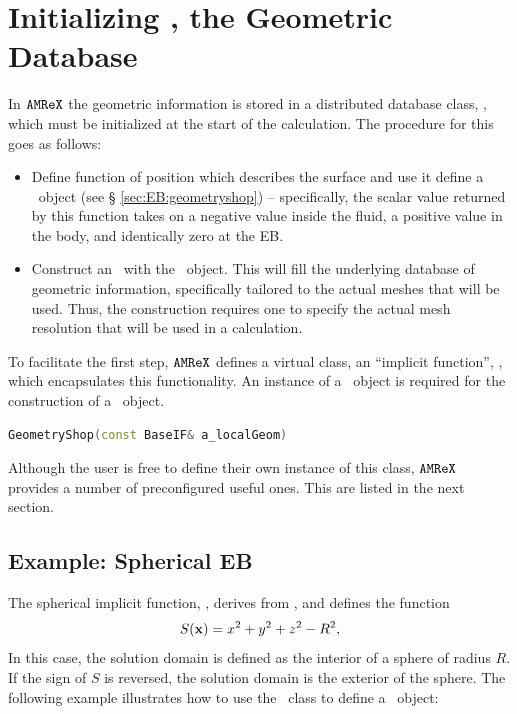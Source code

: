 \section{Initializing \ebis, the Geometric Database}
\label{sec:EB:ebinit}

In $\tt{AMReX}$ the geometric information is stored in a distributed database class, \ebis, which must be
initialized at the start of the calculation.  The procedure for this
goes as follows:
\begin{itemize}
\item Define function of position which describes the surface 
      and use it define a \geom\ object (see \S
      \ref{sec:EB:geometryshop}) -- specifically, the scalar value returned by this function takes on a
      negative value inside the fluid, a positive value in the body, and identically zero at the EB.
\item Construct an \ebis\ with the \geom\ object.   This
  will fill the underlying database of geometric information, specifically tailored to the
  actual meshes that will be used.  Thus, the construction requires one to specify
  the actual mesh resolution that will be used in a calculation.
\end{itemize}

To facilitate the first step, $\tt{AMReX}$ defines a virtual class, an ``implicit function'', \baseif, which encapsulates this functionality.
An instance of a \baseif\ object is required for the construction of a \geom\ object.
\begin{lstlisting}[language=cpp]
    GeometryShop(const BaseIF& a_localGeom)
\end{lstlisting}
Although the user is free to define their own instance of this class, $\tt{AMReX}$ provides a number of preconfigured useful ones.  This
are listed in the next section.

\subsection{Example: Spherical EB}
The spherical implicit function, \sphereif, derives from \baseif, and defines the function
$$
S({\bf x}) = x^2 + y^2 + z^2 - R^2,
$$
In this case, the solution domain is defined as the interior of a sphere of radius $R$.
If the sign of $S$ is reversed, the solution domain is the exterior of the sphere.
The following example illustrates how to use the \sphereif\ class to define a \geom\ object:


